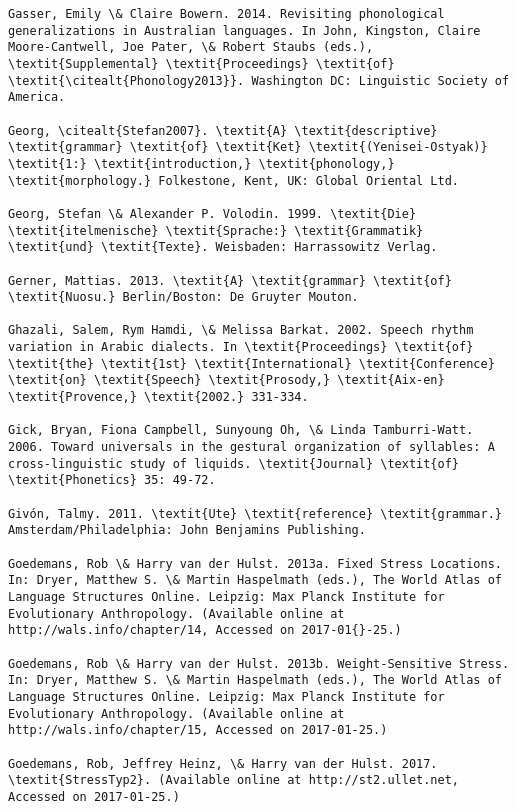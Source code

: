 \begin{verbatim}
Gasser, Emily \& Claire Bowern. 2014. Revisiting phonological generalizations in Australian languages. In John, Kingston, Claire Moore-Cantwell, Joe Pater, \& Robert Staubs (eds.), \textit{Supplemental} \textit{Proceedings} \textit{of} \textit{\citealt{Phonology2013}}. Washington DC: Linguistic Society of America.

Georg, \citealt{Stefan2007}. \textit{A} \textit{descriptive} \textit{grammar} \textit{of} \textit{Ket} \textit{(Yenisei-Ostyak)} \textit{1:} \textit{introduction,} \textit{phonology,} \textit{morphology.} Folkestone, Kent, UK: Global Oriental Ltd.

Georg, Stefan \& Alexander P. Volodin. 1999. \textit{Die} \textit{itelmenische} \textit{Sprache:} \textit{Grammatik} \textit{und} \textit{Texte}. Weisbaden: Harrassowitz Verlag.

Gerner, Mattias. 2013. \textit{A} \textit{grammar} \textit{of} \textit{Nuosu.} Berlin/Boston: De Gruyter Mouton.

Ghazali, Salem, Rym Hamdi, \& Melissa Barkat. 2002. Speech rhythm variation in Arabic dialects. In \textit{Proceedings} \textit{of} \textit{the} \textit{1st} \textit{International} \textit{Conference} \textit{on} \textit{Speech} \textit{Prosody,} \textit{Aix-en} \textit{Provence,} \textit{2002.} 331-334.

Gick, Bryan, Fiona Campbell, Sunyoung Oh, \& Linda Tamburri-Watt. 2006. Toward universals in the gestural organization of syllables: A cross-linguistic study of liquids. \textit{Journal} \textit{of} \textit{Phonetics} 35: 49-72.

Givón, Talmy. 2011. \textit{Ute} \textit{reference} \textit{grammar.} Amsterdam/Philadelphia: John Benjamins Publishing.

Goedemans, Rob \& Harry van der Hulst. 2013a. Fixed Stress Locations. In: Dryer, Matthew S. \& Martin Haspelmath (eds.), The World Atlas of Language Structures Online. Leipzig: Max Planck Institute for Evolutionary Anthropology. (Available online at http://wals.info/chapter/14, Accessed on 2017-01{}-25.)

Goedemans, Rob \& Harry van der Hulst. 2013b. Weight-Sensitive Stress. In: Dryer, Matthew S. \& Martin Haspelmath (eds.), The World Atlas of Language Structures Online. Leipzig: Max Planck Institute for Evolutionary Anthropology. (Available online at http://wals.info/chapter/15, Accessed on 2017-01-25.)

Goedemans, Rob, Jeffrey Heinz, \& Harry van der Hulst. 2017. \textit{StressTyp2}. (Available online at http://st2.ullet.net, Accessed on 2017-01-25.)


\end{verbatim}
